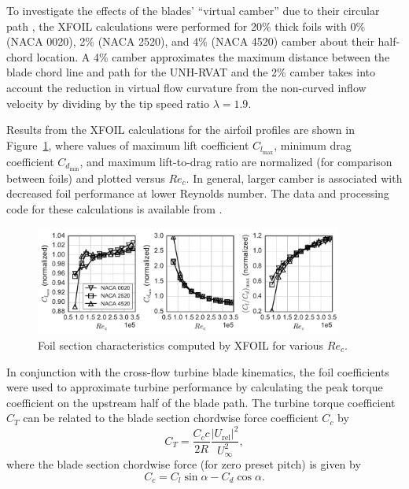 \documentclass[energies,article,accept,moreauthors,pdftex,12pt,a4paper]{mdpi}
\begin{document}
To investigate the effects of the blades' ``virtual camber'' due to their
circular path \cite{Migliore1980}, the XFOIL calculations were performed for
20\% thick foils with 0\% (NACA 0020), 2\% (NACA 2520), and 4\% (NACA 4520)
camber about their half-chord location. A 4\% camber approximates the maximum
distance between the blade chord line and path for the UNH-RVAT and the 2\%
camber takes into account the reduction in virtual flow curvature from the
non-curved inflow velocity by dividing by the tip speed ratio $\lambda=1.9$.

Results from the XFOIL calculations for the airfoil profiles are shown in
Figure~\ref{fig:foil-Re-dep}, where values of maximum lift coefficient
$C_{l_{\max}}$, minimum drag coefficient $C_{d_{\min}}$, and maximum
lift-to-drag ratio are normalized (for comparison between foils) and plotted
versus $Re_c$. In general, larger camber is associated with decreased foil
performance at lower Reynolds number. The data and processing code for these
calculations is available from \cite{Bachant2015-NACAXX20-XFOIL}.

\begin{figure}[ht!]
\centering
\includegraphics[width=0.9\textwidth]{figures/all_foils_re_dep}
\caption{Foil section characteristics computed by XFOIL for various $Re_c$.}
\label{fig:foil-Re-dep}
\end{figure}

In conjunction with the cross-flow turbine blade kinematics, the foil
coefficients were used to approximate turbine performance by calculating the
peak torque coefficient on the upstream half of the blade path. The turbine
torque coefficient $C_T$ can be related to the blade section chordwise force
coefficient $C_c$ by
\begin{equation}
C_T = \frac{C_c c}{2R} \frac{|U_\mathrm{rel}|^2}{U_\infty^2},
\label{eq:ct}
\end{equation}
where the blade section chordwise force (for zero preset pitch) is given by
\begin{equation}
C_c = C_l \sin \alpha - C_d \cos \alpha.
\label{eq:cc}
\end{equation}
\end{document}
